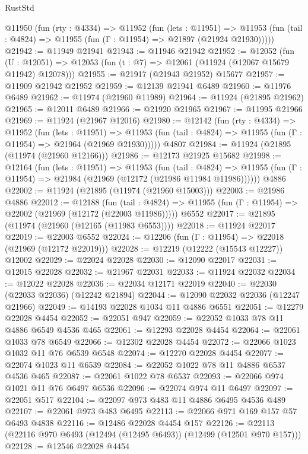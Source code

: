 \begin{lexlean}{RustStd}
\begin{coremodule}
{\begin{coremodule}
{{{{{{{{{{{{{{{{{{{{{{{{{{{{{{{{{{{{{{{{{{{{{{{{{{{{{{{{{{{{{{{{{{{{{{{{{{{{{{{{  @11950
    (fun (rty : @4334) =>
    @11952
      (fun (lets : @11951) =>
      @11953 (fun (tail : @4824) => @11955 (fun (Γ : @11954) => @21897 (@21924 @21930)))))
@21942 := @11949 @21941
@21943 := @11946 @21942
@21952 := @12052
    (fun (U : @12051) => @12053 (fun (t : @7) => @12061 (@11924 (@12067 @15679 @11942) @12078)))
@21955 := @21917 (@21943 @21952) @15677
@21957 := @11909 @21942 @21952
@21959 := @12139 @21941 @6489
@21960 := @11976 @6489
@21962 := @11974 (@21960 @11989)
@21964 := @11924 (@21895 @21962)
@21965 := @12011 @6489
@21966 := @21920 @21965
@21967 := @11995 @21966
@21969 := @11924 (@21967 @12016)
@21980 := @12142
    (fun (rty : @4334) =>
    @11952
      (fun (lets : @11951) =>
      @11953 (fun (tail : @4824) => @11955 (fun (Γ : @11954) => @21964 (@21969 @21930)))))
    @4807
@21984 := @11924 (@21895 (@11974 (@21960 @12166)))
@21986 := @12173 @21925 @15682
@21998 := @12164
    (fun (lets : @11951) =>
    @11953
      (fun (tail : @4824) =>
      @11955 (fun (Γ : @11954) => @21984 (@21969 (@12172 (@21986 @11984 @11986))))))
    @4886
@22002 := @11924 (@21895 (@11974 (@21960 @15003)))
@22003 := @21986 @4886
@22012 := @12188
    (fun (tail : @4824) => @11955 (fun (Γ : @11954) => @22002 (@21969 (@12172 (@22003 @11986)))))
    @6552
@22017 := @21895 (@11974 (@21960 (@12165 (@11983 @6553))))
@22018 := @11924 @22017
@22019 := @22003 @6552
@22024 := @12206 (fun (Γ : @11954) => @22018 (@21969 (@12172 @22019)))
@22028 := @12219 (@12222 (@15543 @12227)) @12002
@22029 := @22024 @22028
@22030 := @12090 @22017
@22031 := @12015 @22028
@22032 := @21967 @22031
@22033 := @11924 @22032
@22034 := @12022 @22028
@22036 := @22034 @12171 @22019
@22040 := @22030 (@22033 @22036) (@12242 @21894)
@22044 := @12090 @22032 @22036 (@12247 @21966)
@22049 := @14193 @22028 @1034 @11 @4886 @6551
@22051 := @12279 @22028 @4454
@22052 := @22051 @947
@22059 := @22052 @1033 @78 @11 @4886 @6549 @4536 @465
@22061 := @12293 @22028 @4454
@22064 := @22061 @1033 @78 @6549
@22066 := @12302 @22028 @4454
@22072 := @22066 @1023 @1032 @11 @76 @6539 @6548
@22074 := @12270 @22028 @4454
@22077 := @22074 @1023 @11 @6539
@22084 := @22052 @1022 @78 @11 @4886 @6537 @4536 @465
@22087 := @22061 @1022 @78 @6537
@22093 := @22066 @974 @1021 @11 @76 @6497 @6536
@22096 := @22074 @974 @11 @6497
@22097 := @22051 @517
@22104 := @22097 @973 @483 @11 @4886 @6495 @4536 @489
@22107 := @22061 @973 @483 @6495
@22113 := @22066 @971 @169 @157 @57 @6493 @4838
@22116 := @12486 @22028 @4454 @157
@22126 := @22113 (@22116 @970 @6493 (@12494 (@12495 @6493)) (@12499 (@12501 @970 @157)))
@22128 := @12546 @22028 @4454
}}}}}}}}}}}}}}}}}}}}}}}}}}}}}}}}}}}}}}}}}}}}}}}}}}}}}}}}}}}}}}}}}}}}}}}}}}}}}}}}
\end{coremodule}}
\end{coremodule}
\end{lexlean}
